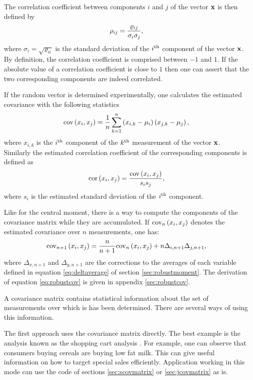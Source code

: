\documentclass[twoside]{book}
\begin{document}
The correlation coefficient between components $i$ and $j$ of the
vector ${\bf x}$ is then defined by
\begin{equation}
 \rho_{ij}={\varrho_{ij}\over \sigma_i \sigma_j},
\end{equation}
where $\sigma_i=\sqrt{\varrho_{ii}}$ is the standard deviation of
the $i^{\mathop{\rm th}}$ component of the vector ${\bf x}$. By definition, the
correlation coefficient is comprised between $-1$ and $1$. If the
absolute value of a correlation coefficient is close to $1$ then
one can assert that the two corresponding components are indeed
correlated.

If the random vector is determined experimentally, one calculates
the estimated covariance with the following statistics
\begin{equation}
 \mathop{\rm cov}\left(x_i,x_j\right)={1\over n}\sum_{k=1}^n
 \left(x_{i,k}-\mu_i\right)\left(x_{j,k}-\mu_j\right),
\end{equation}
where $x_{i,k}$ is the $i^{\mathop{\rm th}}$ component of the $k^{\mathop{\rm th}}$ measurement
of the vector ${\bf x}$. Similarly the estimated correlation
coefficient of the corresponding components is defined as
\begin{equation}
 \mathop{\rm cor}\left(x_i,x_j\right)={\mathop{\rm cov}\left(x_i,x_j\right)\over s_i s_j},
\end{equation}
where $s_i$ is the estimated standard deviation of the $i^{\mathop{\rm th}}$
component.

Like for the central moment, there is a way to compute the
components of the covariance matrix while they are accumulated. If
${\mathop{\rm cov}}_n\left(x_i,x_j\right)$ denotes the estimated covariance
over $n$ measurements, one has:
\begin{equation}
\label{eq:robustcov}
 {\mathop{\rm cov}}_{n+1}\left(x_i,x_j\right)={n\over
 n+1}{\mathop{\rm cov}}_n\left(x_i,x_j\right)+n\Delta_{i,n+1}\Delta_{j,n+1},
\end{equation}
where $\Delta_{x,n+1}$ and $\Delta_{y,n+1}$ are the corrections to
the averages of each variable defined in equation
\ref{eq:deltaverage} of section \ref{sec:robustmoment}. The
derivation of equation \ref{eq:robustcov} is given in appendix
\ref{sec:robustcov}.

 A covariance matrix
contains statistical information about the set of measurements
over which is has been determined. There are several ways of using
this information.

The first approach uses the covariance matrix directly. The best
example is the analysis known as the shopping cart analysis
\cite{BerLin}. For example, one can observe that consumers buying
cereals are buying low fat milk. This can give useful information
on how to target special sales efficiently. Application working in
this mode can use the code of sections \ref{sec:scovmatrix} or
\ref{sec:jcovmatrix} as is.
\end{document}
